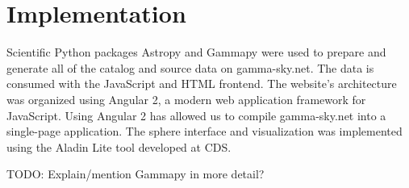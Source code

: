 \section{Implementation}



Scientific Python packages Astropy and Gammapy \cite{gammapy} were used to prepare and generate all of the catalog and source data on gamma-sky.net. The data is consumed with the JavaScript and HTML frontend. The website's architecture was organized using Angular 2, a modern web application framework for JavaScript. Using Angular 2 has allowed us to compile gamma-sky.net into a single-page application. The sphere interface and visualization was implemented using the Aladin Lite tool \cite{aladin-lite} developed at CDS.

TODO: Explain/mention Gammapy in more detail?
